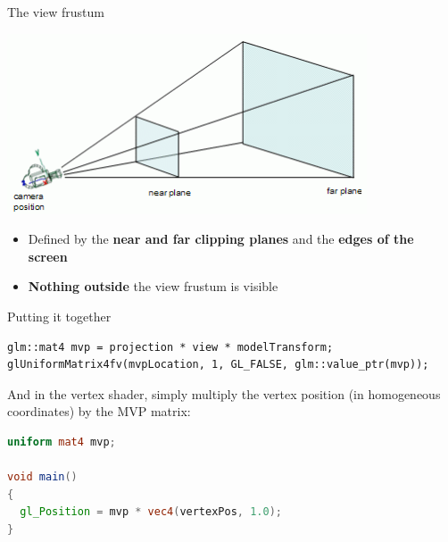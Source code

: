 \begin{frame}{The view frustum}
	\pause\begin{center}
		\includegraphics[width=0.8\textwidth]{frustum}
	\end{center}
	\begin{itemize}
		\pause\item Defined by the \textbf{near and far clipping planes} and the \textbf{edges of the screen}
		\pause\item \textbf{Nothing outside} the view frustum is visible
	\end{itemize}
\end{frame}

\begin{frame}[fragile]{Putting it together}
	\pause\begin{lstlisting}
glm::mat4 mvp = projection * view * modelTransform;
glUniformMatrix4fv(mvpLocation, 1, GL_FALSE, glm::value_ptr(mvp));
	\end{lstlisting}
	\pause And in the vertex shader, simply multiply the vertex position (in homogeneous coordinates) by the MVP matrix:
	\pause\begin{lstlisting}[language=GLSL]
uniform mat4 mvp;

void main()
{
  gl_Position = mvp * vec4(vertexPos, 1.0);
}
	\end{lstlisting}
\end{frame}
